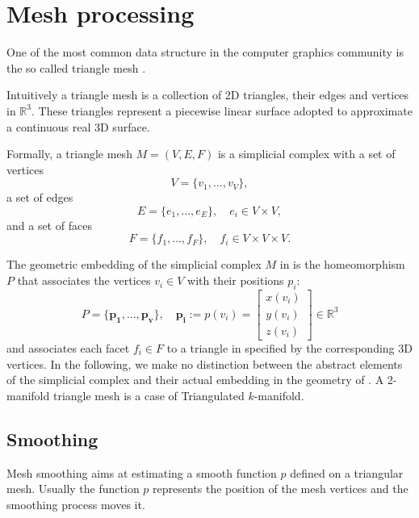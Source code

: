 \section{Mesh processing}
One of the most common data structure in the computer graphics community is the so called triangle mesh \cite{botsch2010polygon}.

Intuitively a triangle mesh is a collection of 2D triangles, their edges and vertices in $\mathbb{R}^3$. 
These triangles represent a piecewise linear surface adopted to approximate a continuous real 3D surface. 

Formally, a triangle mesh $\mathit{M} = (V,E,F)$ is a simplicial complex with a set of vertices
\[
  \mathit{V} = \{v_1, \dots, v_V\},
\]
a set of edges
\[
  \mathit{E} = \{e_1, \dots, e_E\}, \quad e_i \in \mathit{V}\times\mathit{V},
\]
and a set of faces
\[
  \mathit{F} = \{f_1, \dots, f_F\},\quad f_i \in \mathit{V}\times\mathit{V}\times\mathit{V}.
\]

The geometric embedding of the simplicial complex $\mathit{M}$ in \Rthree  is the homeomorphism $\mathit{P}$ that associates the vertices $v_i \in \mathit{V}$ with their positions $p_i$:
\[
\mathit{P} = \{\mathbf{p_1}, \dots, \mathbf{p_v}\}, \quad \mathbf{p_i}:=p(v_i) = 
\begin{bmatrix}
x(v_i)\\
y(v_i)\\
z(v_i)
\end{bmatrix}
\in \mathbb{R}^3
\]
and associates each facet $f_i\in \mathit{F}$ to a triangle in \Rthree specified by the corresponding  3D vertices.
In the following, we make no distinction between the abstract elements of the simplicial complex and their actual embedding in the geometry of \Rthree.
A 2-manifold triangle mesh is a case of Triangulated $k$-manifold.
% 

\subsection{Smoothing}
Mesh smoothing aims at estimating a smooth function $p$ defined on a triangular mesh.
Usually the function $p$ represents the position of the mesh vertices and the smoothing process moves it. 

